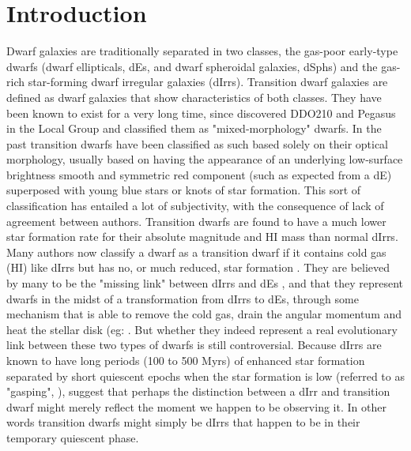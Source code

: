 \documentclass[12pt,preprint]{aastex}
\begin{document}

\section{Introduction}

Dwarf galaxies are traditionally separated in two classes, the gas-poor early-type dwarfs (dwarf ellipticals, dEs, and dwarf spheroidal galaxies, 
dSphs) and the gas-rich star-forming dwarf irregular galaxies (dIrrs). Transition dwarf galaxies are defined as dwarf galaxies that show characteristics 
of both classes. They have been known to exist for a very long time, since \cite{vdb59} discovered DDO210 and Pegasus in the Local Group and 
classified them as "mixed-morphology" dwarfs. In the past transition dwarfs have been classified as such based solely on their optical morphology, 
usually based on having the appearance of an underlying low-surface brightness smooth and symmetric red component (such as expected from a dE) 
superposed with young blue stars or knots of star formation. This sort of classification has entailed a lot of subjectivity, with the consequence of lack of 
agreement between authors. Transition dwarfs are found to have a much lower star formation rate for their absolute magnitude and HI mass than 
normal dIrrs. Many authors now classify a dwarf as a transition dwarf if it contains cold gas (HI) like dIrrs but has no, or much reduced, star formation 
\cite{m98,ggh03,scm03a,cds09}. They are believed by many to be the "missing link" between dIrrs and dEs \cite{hhmh97,ksg99,li13}, and that they 
represent dwarfs in the midst of a transformation from dIrrs to dEs, through some mechanism that is able to remove the cold gas, drain the angular 
momentum and heat the stellar disk (eg: \cite{scm03a}. But whether they indeed represent a real evolutionary link between these two types of dwarfs 
is still controversial. Because dIrrs are known to have long periods (100 to 500 Myrs) of enhanced star formation separated by short quiescent epochs 
when the star formation is low (referred to as "gasping", \cite{t91}), \cite{mcc12} suggest that perhaps the distinction between a dIrr and transition dwarf 
might merely reflect the moment we happen to be observing it. In other words transition dwarfs might simply be dIrrs that happen to be in their temporary 
quiescent phase.
\end{document}
